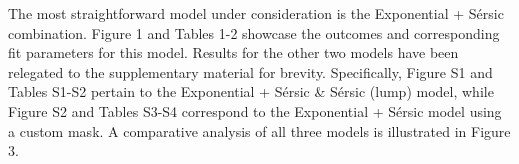 The most straightforward model under consideration is the Exponential + Sérsic combination. Figure 1 and Tables 1-2 showcase the outcomes and corresponding fit parameters for this model. Results for the other two models have been relegated to the supplementary material for brevity. Specifically, Figure S1 and Tables S1-S2 pertain to the Exponential + Sérsic \& Sérsic (lump) model, while Figure S2 and Tables S3-S4 correspond to the Exponential + Sérsic model using a custom mask. A comparative analysis of all three models is illustrated in Figure 3.


